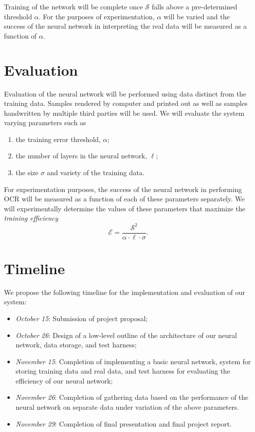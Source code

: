 \documentclass{article}
\begin{document}
Training of the network will be complete once $\mathscr{S}$ falls above a pre-determined threshold $\alpha$. For the purposes of experimentation, $\alpha$ will be varied and the success of the neural network in interpreting the real data will be measured as a function of $\alpha$.

\section{Evaluation}

Evaluation of the neural network will be performed using data distinct from the training data. Samples rendered by computer and printed out as well as samples handwritten by multiple third parties will be used. We will evaluate the system varying parameters such as
\begin{enumerate}
\item the training error threshold, $\alpha$;
\item the number of layers in the neural network, $\ell$;
\item the size $\sigma$ and variety of the training data.
\end{enumerate}
For experimentation purposes, the success of the neural network in performing OCR will be measured as a function of each of these parameters separately. We will experimentally determine the values of these parameters that maximize the \emph{training efficiency}
\begin{equation}\mathscr{E}=\frac{\mathscr{S}^2}{\alpha\cdot\ell\cdot\sigma}.\end{equation}

\section{Timeline}

We propose the following timeline for the implementation and evaluation of our system:

\begin{itemize}
\item \emph{October 15}: Submission of project proposal;
\item \emph{October 26}: Design of a low-level outline of the architecture of our neural network, data storage, and test harness;
\item \emph{November 15}: Completion of implementing a basic neural network, system for storing training data and real data, and test harness for evaluating the efficiency of our neural network;
\item \emph{November 26}: Completion of gathering data based on the performance of the neural network on separate data under variation of the above parameters.
\item \emph{November 29}: Completion of final presentation and final project report.
\end{itemize}
\end{document}

